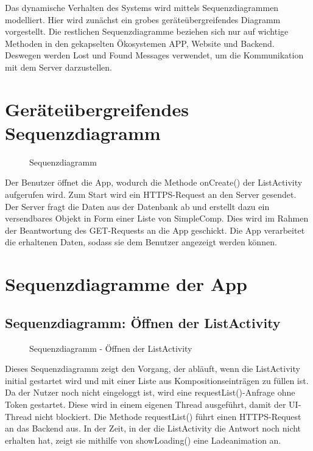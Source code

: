 	Das dynamische Verhalten des Systems wird mittels Sequenzdiagrammen modelliert.
	Hier wird zunächst ein grobes geräteübergreifendes Diagramm vorgestellt.
	Die restlichen Sequenzdiagramme beziehen sich nur auf wichtige Methoden in den gekapselten Ökosystemen APP, Website und Backend. Deswegen werden Lost und Found Messages verwendet, um die Kommunikation mit dem Server darzustellen. 
	
\section*{Geräteübergreifendes Sequenzdiagramm}

\begin{figure}[h]
	\centering
	\caption{Sequenzdiagramm}
	\label{fig:sequenz-a}
\end{figure}
\noindent
Der Benutzer öffnet die App, wodurch die Methode onCreate() der ListActivity aufgerufen wird. Zum Start wird ein HTTPS-Request an den Server gesendet. Der Server fragt die Daten aus der Datenbank ab und erstellt dazu ein versendbares Objekt in Form einer Liste von SimpleComp. Dies wird im Rahmen der Beantwortung des GET-Requests an die App geschickt. Die App verarbeitet die erhaltenen Daten, sodass sie dem Benutzer angezeigt werden können.

\section*{Sequenzdiagramme der App}
\subsection*{Sequenzdiagramm: Öffnen der ListActivity}

\begin{figure}[h]
	\centering
	\caption{Sequenzdiagramm - Öffnen der ListActivity}
	\label{fig:sequenz-a}
\end{figure}
\noindent
Dieses Sequenzdiagramm zeigt den Vorgang, der abläuft, wenn die ListActivity initial gestartet wird und mit einer Liste aus Kompositionseinträgen zu füllen ist.
Da der Nutzer noch nicht eingeloggt ist, wird eine requestList()-Anfrage ohne Token gestartet. Diese wird in einem eigenen Thread ausgeführt, damit der UI-Thread nicht blockiert. Die Methode requestList() führt einen HTTPS-Request an das Backend aus. In der Zeit, in der die ListActivity die Antwort noch nicht erhalten hat, zeigt sie mithilfe von showLoading() eine Ladeanimation an.

